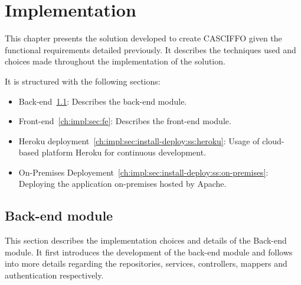 % 
%
\chapter{Implementation}\label{ch:impl}

This chapter presents the solution developed to create CASCIFFO given the functional requirements detailed previously. It describes the techniques used and choices made throughout the implementation of the solution.

It is structured with the following sections:
\begin{itemize}
    \item Back-end~\ref{ch:impl:sec:be}: Describes the back-end module.
    \item Front-end~\ref{ch:impl:sec:fe}: Describes the front-end module.
    \item Heroku deployment~\ref{ch:impl:sec:install-deploy:ss:heroku}: Usage of cloud-based platform Heroku for continuous development.
    \item On-Premises Deployement~\ref{ch:impl:sec:install-deploy:ss:on-premises}: Deploying the application on-premises hosted by Apache.
\end{itemize}


\section{Back-end module}\label{ch:impl:sec:be}
This section describes the implementation choices and details of the Back-end module.
It first introduces the development of the back-end module and follows into more details regarding the repositories, services, controllers, mappers and authentication respectively.

